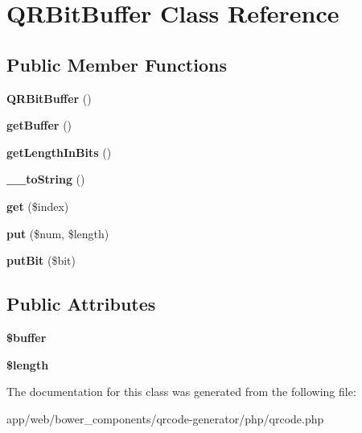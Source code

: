 \hypertarget{class_q_r_bit_buffer}{}\section{Q\+R\+Bit\+Buffer Class Reference}
\label{class_q_r_bit_buffer}
\subsection*{Public Member Functions}
\begin{DoxyCompactItemize}
\item 
\mbox{\label{class_q_r_bit_buffer_a314ad0c14796b97c26c5fc98cf849e66}} 
{\bfseries Q\+R\+Bit\+Buffer} ()
\item 
\mbox{\label{class_q_r_bit_buffer_af600e72c30462784edebd4f747e2b3a0}} 
{\bfseries get\+Buffer} ()
\item 
\mbox{\label{class_q_r_bit_buffer_aa3700814c1dbec780a9053fa34bab88b}} 
{\bfseries get\+Length\+In\+Bits} ()
\item 
\mbox{\label{class_q_r_bit_buffer_a55e94da7a500476909df60cdf6cab86b}} 
{\bfseries \+\_\+\+\_\+to\+String} ()
\item 
\mbox{\label{class_q_r_bit_buffer_a935c88a51411c9afbe5e4f5494dd700e}} 
{\bfseries get} (\$index)
\item 
\mbox{\label{class_q_r_bit_buffer_a60ac2ae935427c13bdc6f6f9081c22cf}} 
{\bfseries put} (\$num, \$length)
\item 
\mbox{\label{class_q_r_bit_buffer_a5029b197b2fd2fd6b23ec91850de9bf9}} 
{\bfseries put\+Bit} (\$bit)
\end{DoxyCompactItemize}
\subsection*{Public Attributes}
\begin{DoxyCompactItemize}
\item 
\mbox{\label{class_q_r_bit_buffer_aef4fcdd1dbb1391cba488e3227c37d35}} 
{\bfseries \$buffer}
\item 
\mbox{\label{class_q_r_bit_buffer_a6a52ee503dd7ef1d06719db238321faf}} 
{\bfseries \$length}
\end{DoxyCompactItemize}


The documentation for this class was generated from the following file\+:\begin{DoxyCompactItemize}
\item 
app/web/bower\+\_\+components/qrcode-\/generator/php/qrcode.\+php\end{DoxyCompactItemize}

